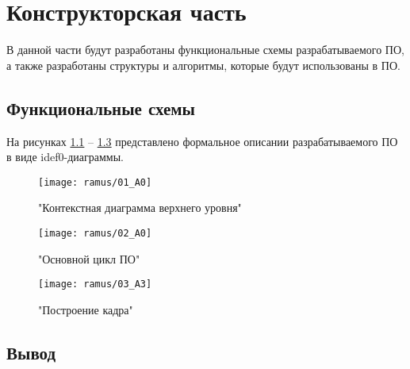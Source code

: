 \chapter{Конструкторская часть}

В данной части будут разработаны функциональные схемы разрабатываемого ПО, а также разработаны структуры и алгоритмы, которые будут использованы в ПО.

\section{Функциональные схемы} 

На рисунках \ref{fig:A0} -- \ref{fig:A3} представлено формальное описании разрабатываемого ПО в виде idef0-диаграммы.

\begin{figure}[H]
	\centering
	\texttt{[image: ramus/01\_A0]}
	\caption{"Контекстная диаграмма верхнего уровня"}
	\label{fig:A0}
\end{figure}

\begin{figure}[H]
	\centering
	\texttt{[image: ramus/02\_A0]}
	\caption{"Основной цикл ПО"}
	\label{fig:A1}
\end{figure}

\begin{figure}[H]
	\centering
	\texttt{[image: ramus/03\_A3]}
	\caption{"Построение кадра"}
	\label{fig:A3}
\end{figure}




\section*{Вывод}

\clearpage
